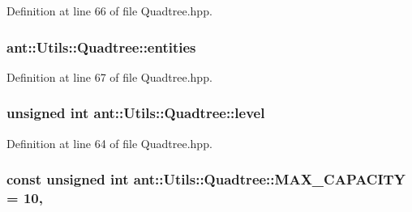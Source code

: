 Definition at line 66 of file Quadtree.\+hpp.

\hypertarget{classant_1_1_utils_1_1_quadtree_af71256d6656bfde8f416e5a34bc71607}{
\subsubsection[{entities}]{ ant\+::\+Utils\+::\+Quadtree\+::entities\hspace{0.3cm}{\ttfamily [private]}}}\label{classant_1_1_utils_1_1_quadtree_af71256d6656bfde8f416e5a34bc71607}


Definition at line 67 of file Quadtree.\+hpp.

\hypertarget{classant_1_1_utils_1_1_quadtree_afae97d3832d54987e09661dd7c14cfc6}{
\subsubsection[{level}]{\setlength{\rightskip}{0pt plus 5cm}unsigned int ant\+::\+Utils\+::\+Quadtree\+::level\hspace{0.3cm}{\ttfamily [private]}}}\label{classant_1_1_utils_1_1_quadtree_afae97d3832d54987e09661dd7c14cfc6}


Definition at line 64 of file Quadtree.\+hpp.

\hypertarget{classant_1_1_utils_1_1_quadtree_af040bf0509e7bf6cecd9b7d5c7cf5c0b}{
\subsubsection[{M\+A\+X\+\_\+\+C\+A\+P\+A\+C\+I\+T\+Y}]{\setlength{\rightskip}{0pt plus 5cm}const unsigned int ant\+::\+Utils\+::\+Quadtree\+::\+M\+A\+X\+\_\+\+C\+A\+P\+A\+C\+I\+T\+Y = 10\hspace{0.3cm}{\ttfamily [static]}, {\ttfamily [private]}}}\label{classant_1_1_utils_1_1_quadtree_af040bf0509e7bf6cecd9b7d5c7cf5c0b}



